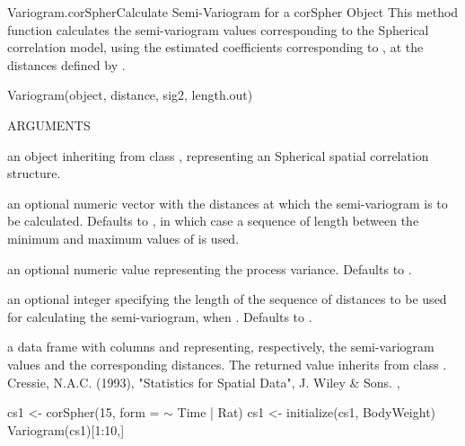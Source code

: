 \documentclass[pdftex]{article} \usepackage{url,graphicx}
\renewcommand{\Twiddle}{\mbox{\(\sim\)}}
\begin{document}
\begin{Helpfile}{Variogram.corSpher}{Calculate Semi-Variogram for a
    corSpher Object} This method function calculates the
  semi-variogram values corresponding to the Spherical correlation
  model, using the estimated coefficients corresponding to
  , at the distances defined by .
\begin{Example}
Variogram(object, distance, sig2, length.out)
\end{Example}
\begin{Argument}{ARGUMENTS}
\item[\Co{object:}]
an object inheriting from class ,
representing an Spherical spatial correlation structure.
\item[\Co{distance:}]
an optional numeric vector with the distances at
which the semi-variogram is to be calculated. Defaults to
, in which case a sequence of length 
between the minimum and maximum values of
 is used.
\item[\Co{sig2:}]
an optional numeric value representing the process
variance. Defaults to .
\item[\Co{length.out:}]
an optional integer specifying the length of the
sequence of distances to be used for calculating the semi-variogram,
when . Defaults to .
\end{Argument}
a data frame with columns  and  representing,
respectively, the semi-variogram values and the corresponding
distances. The returned value inherits from class .
Cressie, N.A.C. (1993), "Statistics for Spatial Data", J. Wiley \& Sons.
, 
\need 15pt
\vspace{-16pt}
\begin{Example}
cs1 <- corSpher(15, form = {\Twiddle} Time | Rat)
cs1 <- initialize(cs1, BodyWeight)
Variogram(cs1)[1:10,]
\end{Example}
\end{Helpfile}
\end{document}
